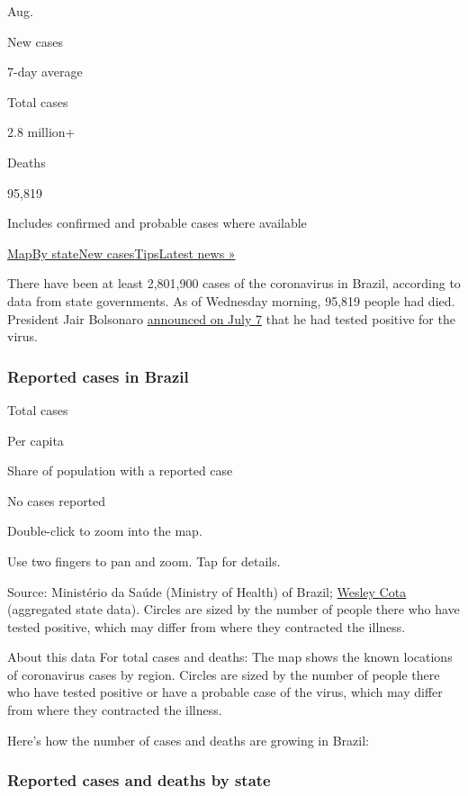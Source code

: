 Aug.

New cases

7-day average

Total cases

2.8 million+

Deaths

95,819

Includes confirmed and probable cases where available

\protect\hyperlink{map}{Map}\protect\hyperlink{states}{By
state}\protect\hyperlink{cases}{New
cases}\protect\hyperlink{tips}{Tips}\href{https://www.nytimes.com/2020/08/04/world/coronavirus-covid-19.html}{Latest
news »}

There have been at least 2,801,900 cases of the coronavirus in Brazil,
according to data from state governments. As of Wednesday morning,
95,819 people had died. President Jair Bolsonaro
\href{https://www.nytimes.com/2020/07/07/world/americas/brazil-bolsonaro-coronavirus.html}{announced
on July 7} that he had tested positive for the virus.

\hypertarget{reported-cases-in-brazil}{%
\subsubsection{Reported cases in
Brazil}\label{reported-cases-in-brazil}}

Total cases

Per capita

Share of population with a reported case

No cases reported

Double-click to zoom into the map.

Use two fingers to pan and zoom. Tap for details.

Source: Ministério da Saúde (Ministry of Health) of Brazil;
\href{https://github.com/wcota/covid19br}{Wesley Cota} (aggregated state
data). Circles are sized by the number of people there who have tested
positive, which may differ from where they contracted the illness.

About this data For total cases and deaths: The map shows the known
locations of coronavirus cases by region. Circles are sized by the
number of people there who have tested positive or have a probable case
of the virus, which may differ from where they contracted the illness.

Here's how the number of cases and deaths are growing in Brazil:

\hypertarget{reported-cases-and-deaths-by-state}{%
\subsubsection{Reported cases and deaths by
state}\label{reported-cases-and-deaths-by-state}}

